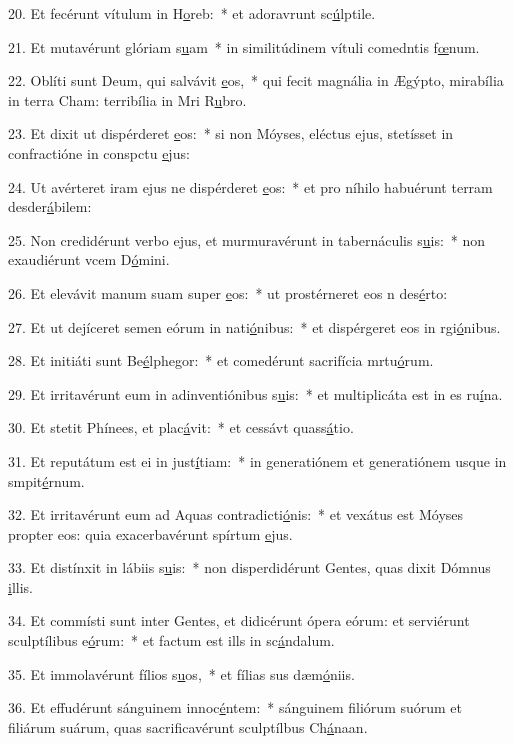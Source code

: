 20. Et fecérunt vítulum in H\uline{o}reb:~* et adoravrunt sc\uline{ú}lptile.\par 
21. Et mutavérunt glóriam s\uline{u}am~* in similitúdinem vítuli comedntis f\uline{œ}num.\par 
22. Oblíti sunt Deum, qui salvávit \uline{e}os,~* qui fecit magnália in Ægýpto, mirabília in terra Cham: terribília in Mri R\uline{u}bro.\par 
23. Et dixit ut dispérderet \uline{e}os:~* si non Móyses, eléctus ejus, stetísset in confractióne in conspctu \uline{e}jus:\par 
24. Ut avérteret iram ejus ne dispérderet \uline{e}os:~* et pro níhilo habuérunt terram desder\uline{á}bilem:\par 
25. Non credidérunt verbo ejus, et murmuravérunt in tabernáculis s\uline{u}is:~* non exaudiérunt vcem D\uline{ó}mini.\par 
26. Et elevávit manum suam super \uline{e}os:~* ut prostérneret eos n des\uline{é}rto:\par 
27. Et ut dejíceret semen eórum in nati\uline{ó}nibus:~* et dispérgeret eos in rgi\uline{ó}nibus.\par 
28. Et initiáti sunt Be\uline{é}lphegor:~* et comedérunt sacrifícia mrtu\uline{ó}rum.\par 
29. Et irritavérunt eum in adinventiónibus s\uline{u}is:~* et multiplicáta est in es ru\uline{í}na.\par 
30. Et stetit Phínees, et plac\uline{á}vit:~* et cessávt quass\uline{á}tio.\par 
31. Et reputátum est ei in just\uline{í}tiam:~* in generatiónem et generatiónem usque in smpit\uline{é}rnum.\par 
32. Et irritavérunt eum ad Aquas contradicti\uline{ó}nis:~* et vexátus est Móyses propter eos: quia exacerbavérunt spírtum \uline{e}jus.\par 
33. Et distínxit in lábiis s\uline{u}is:~* non disperdidérunt Gentes, quas dixit Dómnus \uline{i}llis.\par 
34. Et commísti sunt inter Gentes, et didicérunt ópera eórum: et serviérunt sculptílibus e\uline{ó}rum:~* et factum est ills in sc\uline{á}ndalum.\par 
35. Et immolavérunt fílios s\uline{u}os,~* et fílias sus dæm\uline{ó}niis.\par 
36. Et effudérunt sánguinem innoc\uline{é}ntem:~* sánguinem filiórum suórum et filiárum suárum, quas sacrificavérunt sculptílbus Ch\uline{á}naan.\par 
